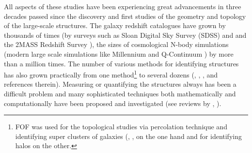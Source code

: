 All aspects of these studies have been experiencing great advancements in  three decades passed since the discovery and first studies of the geometry and topology  of the large-scale structures. The galaxy redshift catalogues have grown by thousands of times (by surveys such as Sloan Digital Sky Survey (SDSS) \citealt{Tegmark2003} and \citealt{Albareti2016} and the 2MASS Redshift Survey \citealt{Huchra2012}), the sizes of cosmological N-body simulations (modern large scale simulations like Millennium \citealt{Springel2005b} and Q-Continuum \citealt{Heitmann2015}) by more than a million times. The number of various methods for identifying  structures has also grown practically from  one method\footnote{FOF was used for the topological studies via percolation technique and identifying super clusters of galaxies (\citealt{Zeldovich1982}, \citealt{Shandarin1983}, \citealt{Shandarin1983b} on the one hand and for identifying halos \citealt{Davis1985} on the other.}  to several dozens (\citealt{Colberg2008}, \citealt{Knebe2011a}, \citealt{Onions2012}, \citealt{Knebe2013} and references therein). Measuring or quantifying  the structures always has  been a difficult problem and many sophisticated  techniques both mathematically and computationally have been proposed and investigated (see reviews by \citealt{Weygaert2008c}, \citealt{Weygaert2008}).


